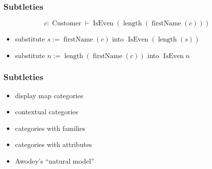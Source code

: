\documentclass[
xcolor={usenames,dvipsnames,svgnames},
]{beamer}
\DeclareMathOperator{\ANZ}{ANZ}
\DeclareMathOperator{\Branch}{Branch}
\DeclareMathOperator{\Customer}{Customer}
\DeclareMathOperator{\Staff}{Staff}
\DeclareMathOperator{\IsEven}{IsEven}
\DeclareMathOperator{\bankOf}{bankOf}
\DeclareMathOperator{\branchOf}{branchOf}
\begin{document}




  \begin{frame}
    \frametitle{Subtleties}
    \begin{center}

      \[
        c : \Customer \vdash \IsEven (\operatorname{length}(\operatorname{firstName}(c)))
      \]

      \begin{itemize}
        \item substitute $s := \operatorname{firstName}(c)$ into $\IsEven(\operatorname{length}(s))$
        \item substitute $n := \operatorname{length}(\operatorname{firstName}(c))$ into $\IsEven n$
      \end{itemize}
    \end{center}
  \end{frame}

  \begin{frame}
    \frametitle{Subtleties}
    \begin{center}

      \begin{itemize}
        \item display map categories
        \item contextual categories
        \item categories with families
        \item categories with attributes
        \item Awodey's ``natural model''
      \end{itemize}
    \end{center}
  \end{frame}
\end{document}
